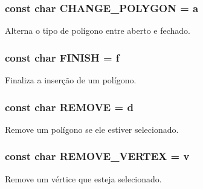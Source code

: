 \subsubsection[{C\+H\+A\+N\+G\+E\+\_\+\+P\+O\+L\+Y\+G\+O\+N}]{\setlength{\rightskip}{0pt plus 5cm}const char C\+H\+A\+N\+G\+E\+\_\+\+P\+O\+L\+Y\+G\+O\+N = \textquotesingle{}a\textquotesingle{}}\label{group___keyboard_map_ga6117f2740efee651caa6f96887bd3ae5}
Alterna o tipo de polígono entre aberto e fechado. \hypertarget{group___keyboard_map_gab55582ef04f6dccb70ffada359e65b7b}{}
\subsubsection[{F\+I\+N\+I\+S\+H}]{\setlength{\rightskip}{0pt plus 5cm}const char F\+I\+N\+I\+S\+H = \textquotesingle{}f\textquotesingle{}}\label{group___keyboard_map_gab55582ef04f6dccb70ffada359e65b7b}
Finaliza a inserção de um polígono. \hypertarget{group___keyboard_map_ga30edd29ec1ca0ef12d97fafb281f5cd5}{}
\subsubsection[{R\+E\+M\+O\+V\+E}]{\setlength{\rightskip}{0pt plus 5cm}const char R\+E\+M\+O\+V\+E = \textquotesingle{}d\textquotesingle{}}\label{group___keyboard_map_ga30edd29ec1ca0ef12d97fafb281f5cd5}
Remove um polígono se ele estiver selecionado. \hypertarget{group___keyboard_map_ga163cf00cd722f47f7cb97ad82d287e20}{}
\subsubsection[{R\+E\+M\+O\+V\+E\+\_\+\+V\+E\+R\+T\+E\+X}]{\setlength{\rightskip}{0pt plus 5cm}const char R\+E\+M\+O\+V\+E\+\_\+\+V\+E\+R\+T\+E\+X = \textquotesingle{}v\textquotesingle{}}\label{group___keyboard_map_ga163cf00cd722f47f7cb97ad82d287e20}
Remove um vértice que esteja selecionado. \hypertarget{group___keyboard_map_ga220657e3f7ae7c0030a20f5784a81432}{}
